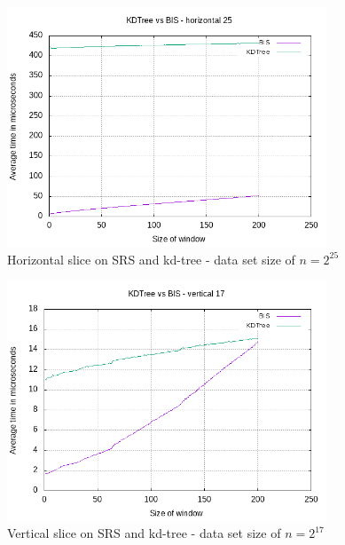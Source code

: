 \begin{figure}[h]
    \centering
    \includegraphics[width = 0.85\textwidth]{pictures/analysis/smalls/hori_25.png}
    \caption{Horizontal slice on SRS and kd-tree - data set size of $n=2^{25}$}\label{fig:small_hori_25}
\end{figure}
\clearpage

\begin{figure}[h]
    \centering
    \includegraphics[width = 0.85\textwidth]{pictures/analysis/smalls/vert_17.png}
    \caption{Vertical slice on SRS and kd-tree - data set size of $n=2^{17}$}\label{fig:small_vert_17}
\end{figure}

